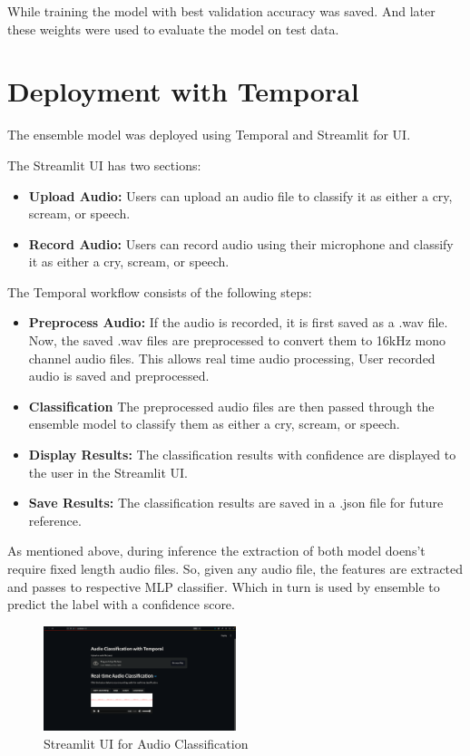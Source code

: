 \documentclass[conference]{IEEEtran}
\begin{document}
While training the model with best validation accuracy was saved. And later these weights were used to evaluate the model on test data.

\section{Deployment with Temporal}
The ensemble model was deployed using Temporal and Streamlit for UI.

The Streamlit UI has two sections:
\begin{itemize}
    \item \textbf{Upload Audio:} Users can upload an audio file to classify it as either a cry, scream, or speech.
    \item \textbf{Record Audio:} Users can record audio using their microphone and classify it as either a cry, scream, or speech.
\end{itemize}

The Temporal workflow consists of the following steps:
\begin{itemize}
    \item \textbf{Preprocess Audio:} If the audio is recorded, it is first saved as a .wav file. Now, the saved .wav files are preprocessed to convert them to 16kHz mono channel audio files. This allows real time audio processing, User recorded audio is saved and preprocessed.
    \item \textbf{Classification} The preprocessed audio files are then passed through the ensemble model to classify them as either a cry, scream, or speech.
    \item \textbf{Display Results:} The classification results with confidence are displayed to the user in the Streamlit UI.
    \item \textbf{Save Results:} The classification results are saved in a .json file for future reference.
\end{itemize}

As mentioned above, during inference the extraction of both model doens't require fixed length audio files. So, given any audio file, the features are extracted and passes to respective MLP classifier. Which in turn is used by ensemble to predict the label with a confidence score.

\begin{figure}[htbp]
\centerline{\includegraphics[width=0.5\textwidth]{streamlit.png}}
\caption{Streamlit UI for Audio Classification}
\label{fig:streamlit_ui}
\end{figure}
\end{document}
